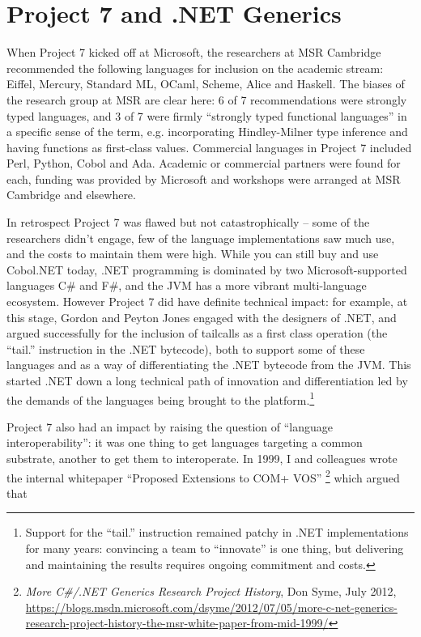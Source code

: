 \documentclass[acmsmall]{acmart}\settopmatter{}
\begin{document}
\section*{Project 7 and .NET Generics}

When Project 7 kicked off at Microsoft, the researchers at MSR Cambridge recommended the following languages for inclusion on the academic
stream: Eiffel, Mercury, Standard ML, OCaml, Scheme, Alice and Haskell.  The biases of the research group at MSR are clear here: 6 of 7 recommendations
were strongly typed languages, and 3 of 7 were firmly “strongly typed functional languages” in a specific sense of the term, e.g. incorporating Hindley-Milner
type inference and having functions as first-class values. Commercial languages in Project 7 included Perl, Python, Cobol and Ada. Academic or commercial
partners were found for each, funding was provided by Microsoft and workshops were arranged at MSR Cambridge and elsewhere.

In retrospect Project 7 was flawed but not catastrophically – some of the researchers didn’t engage, few of the language implementations saw much use, and
the costs to maintain them were high. While you can still buy and use Cobol.NET today, .NET programming is dominated by two Microsoft-supported
languages C\# and F\#, and the JVM has a more vibrant multi-language ecosystem. However Project 7 did have definite technical impact: for example, at
this stage, Gordon and Peyton Jones engaged with the designers of .NET, and argued successfully for the inclusion of tailcalls as a first class
operation (the “tail.” instruction in the .NET bytecode), both to support some of these languages and as a way of differentiating the .NET bytecode from the JVM.  This
started .NET down a long technical path of innovation and differentiation led by the demands of the languages being brought to the
platform.\footnote{ Support for the “tail.” instruction remained patchy in .NET implementations for many years: convincing a team to ``innovate'' is one
thing, but delivering and maintaining the results requires ongoing commitment and costs.}

Project 7 also had an impact by raising the question of “language interoperability”: it was one thing to get languages targeting a common
substrate, another to get them to interoperate.  In 1999, I and colleagues wrote the internal whitepaper “Proposed Extensions
to COM+ VOS” \footnote{ \textit{More C\#/.NET Generics Research Project History}, Don Syme, July 2012,  \url{https://blogs.msdn.microsoft.com/dsyme/2012/07/05/more-c-net-generics-research-project-history-the-msr-white-paper-from-mid-1999/} } which argued that 
\end{document}

